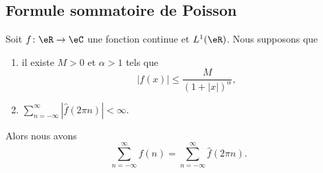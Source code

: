 \subsection{Formule sommatoire de Poisson}

\begin{proposition}   \label{ProprPbkoQ}
	Soit \( f\colon \eR\to \eC\) une fonction continue et \( L^1(\eR)\). Nous supposons que
	\begin{enumerate}
		\item
		      il existe \( M>0\) et \( \alpha>1\) tels que
		      \begin{equation}
			      | f(x) |\leq\frac{ M }{ (1+| x |)^{\alpha} },
		      \end{equation}
		\item
		      \( \sum_{n=-\infty}^{\infty}| \hat f(2\pi n) |<\infty\).

	\end{enumerate}
	Alors nous avons
	\begin{equation}
		\sum_{n=-\infty}^{\infty}f(n)=\sum_{n=-\infty}^{\infty}\hat f(2\pi n).
	\end{equation}
\end{proposition}



